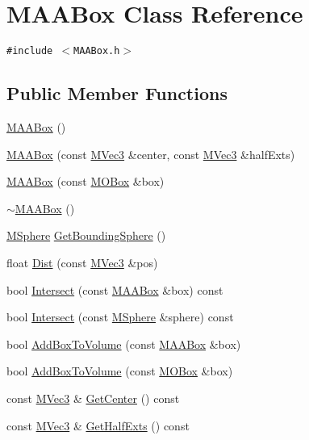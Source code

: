 \hypertarget{class_m_a_a_box}{
\section{MAABox Class Reference}
\label{class_m_a_a_box}
}
{\tt \#include $<$MAABox.h$>$}

\subsection*{Public Member Functions}
\begin{CompactItemize}
\item 
\hyperlink{class_m_a_a_box_d357f82540e29376c81850a165dfd3d6}{MAABox} ()
\item 
\hyperlink{class_m_a_a_box_870aa2351735fc8f49ec780d7fca8aec}{MAABox} (const \hyperlink{class_m_vec3}{MVec3} \&center, const \hyperlink{class_m_vec3}{MVec3} \&halfExts)
\item 
\hyperlink{class_m_a_a_box_7e94c069bfb8537ff9410b8a2b7f89a5}{MAABox} (const \hyperlink{class_m_o_box}{MOBox} \&box)
\item 
\hyperlink{class_m_a_a_box_263ea425cafadae722c43cdfc9160274}{$\sim$MAABox} ()
\item 
\hyperlink{class_m_sphere}{MSphere} \hyperlink{class_m_a_a_box_069339e97ffae23154079bca22eafaf7}{GetBoundingSphere} ()
\item 
float \hyperlink{class_m_a_a_box_f47c228010eab1bd502d80633d50953b}{Dist} (const \hyperlink{class_m_vec3}{MVec3} \&pos)
\item 
bool \hyperlink{class_m_a_a_box_b309a32c61158e79a35b19a339d05248}{Intersect} (const \hyperlink{class_m_a_a_box}{MAABox} \&box) const 
\item 
bool \hyperlink{class_m_a_a_box_8b16f4be06c18802ebed0029ff215d5d}{Intersect} (const \hyperlink{class_m_sphere}{MSphere} \&sphere) const 
\item 
bool \hyperlink{class_m_a_a_box_7da828ab9a51859fb07aedfce50967f0}{AddBoxToVolume} (const \hyperlink{class_m_a_a_box}{MAABox} \&box)
\item 
bool \hyperlink{class_m_a_a_box_b5d6ad41455f8a7c76b41ef305cce52f}{AddBoxToVolume} (const \hyperlink{class_m_o_box}{MOBox} \&box)
\item 
const \hyperlink{class_m_vec3}{MVec3} \& \hyperlink{class_m_a_a_box_a9fbd78524a8e1c00a165177b7cf888f}{GetCenter} () const 
\item 
const \hyperlink{class_m_vec3}{MVec3} \& \hyperlink{class_m_a_a_box_9c4c37dd6c9bffdbe6926c5a4c60145c}{GetHalfExts} () const 

\end{CompactItemize}
